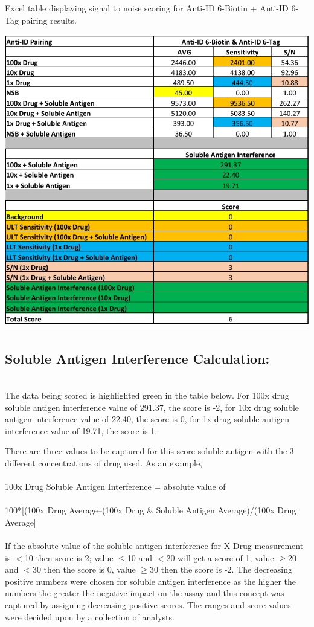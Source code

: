 \begin{table}[ht]
 \centering
 \caption{Excel table displaying signal to noise scoring for Anti-ID 6-Biotin + Anti-ID 6-Tag pairing results.}
 \includegraphics{graphics/ch3/Table_6.pdf}
\end{table} 

\subsection*{Soluble Antigen Interference Calculation:}

\\The data being scored is highlighted green in the table below.  For 100x drug soluble antigen interference value of 291.37, the score is -2, for 10x drug soluble antigen interference value of 22.40, the score is 0, for 1x drug soluble antigen interference value of 19.71, the score is 1.

There are three values to be captured for this score soluble antigen with the 3 different concentrations of drug used.  As an example,
\\
\\
\hspace*{.5in}100x Drug Soluble Antigen Interference = absolute value of
\\
\\
\hspace*{.5in}100*[(100x Drug Average–(100x Drug & Soluble Antigen Average)/(100x Drug Average]
\\
\\
\indent If the absolute value of the soluble antigen interference for X Drug measurement is $<$10 then score is 2; value $\leq$10 and $<$20 will get a score of 1, value $\geq$20 and $<$30 then the score is 0, value $\geq$30 then the score is -2.  The decreasing positive numbers were chosen for soluble antigen interference as the higher the numbers the greater the negative impact on the assay and this concept was captured by assigning decreasing positive scores.  The ranges and score values were decided upon by a collection of analysts.

